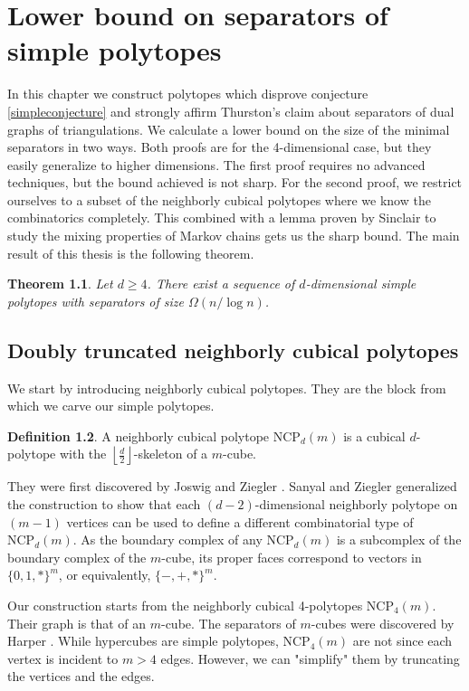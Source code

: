 \documentclass[a4paper,12pt]{book}
\theoremstyle{plain}
\newtheorem{theorem}{Theorem}[section]
\theoremstyle{definition}
\newtheorem{definition}[theorem]{Definition}
\newcommand\NC{\textrm{NCP}}
\begin{document}
\chapter{Lower bound on separators of simple polytopes}
\label{ncpconstruction}

In this chapter we construct polytopes which disprove conjecture \ref{simpleconjecture} and
strongly affirm Thurston's claim about separators of dual graphs of triangulations. We
calculate a lower bound on the size of the minimal separators in two ways. Both proofs are for the
4-dimensional case, but they easily generalize to higher dimensions. The first proof requires
no advanced techniques, but the bound achieved is not sharp. For the second proof,
we restrict ourselves to a subset of the neighborly cubical polytopes where we know the 
combinatorics completely. This combined with a lemma proven by Sinclair to study
the mixing properties of Markov chains gets us the sharp bound. The main result of this
thesis is the following theorem.


\begin{theorem}
\label{maintheorem}
 Let $d\geq 4$. There exist a sequence of $d$-dimensional simple polytopes with
separators of size $\Omega(n/\log n)$.
\end{theorem}

\section{Doubly truncated neighborly cubical polytopes}
\label{ncp}

We start by introducing neighborly cubical polytopes. They are the block from which we carve our simple polytopes.

\begin{definition}
A neighborly cubical polytope $\NC_d(m)$ is a cubical $d$-polytope with the $\left\lfloor \frac{d}{2} 
\right\rfloor$-skeleton of a $m$-cube.
\end{definition}

They were first discovered by Joswig and Ziegler \cite{Z62}. Sanyal and Ziegler \cite{Z102}
generalized the construction to show that each $(d-2)$-dimensional neighborly 
polytope on $(m-1)$ vertices can be used to define a 
different combinatorial type of $\NC_d(m)$. As the boundary complex of any $\NC_d(m)$
is a subcomplex of the boundary complex of the $m$-cube, its proper faces correspond to vectors
in $\{0,1,*\}^m$, or equivalently, $\{-,+,*\}^m$.


Our construction starts from the neighborly cubical 4-polytopes $\NC_4(m)$. 
Their graph is that of an $m$-cube. The separators of $m$-cubes were discovered by Harper 
\cite{Harp}.
While hypercubes are simple polytopes, $\NC_4(m)$ are not since each vertex is 
incident to $m>4$ edges. However, we can "simplify" them by 
truncating the vertices and the edges.
\end{document}
